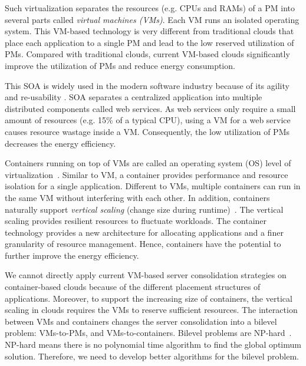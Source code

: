 Such virtualization separates the resources (e.g. CPUs and RAMs) of a PM into several parts called \emph{virtual machines (VMs)}. 
Each VM runs an isolated operating system. This VM-based technology is very different from 
traditional clouds that place each application to a single PM and lead to the low reserved utilization of PMs. 
Compared with traditional clouds, current VM-based clouds significantly improve the utilization of PMs and reduce energy consumption.


 This SOA is widely used in the modern software industry because of its agility and re-usability \cite{Sprott:2004wt}.
SOA separates a centralized application into multiple distributed components called web services. 
As web services only require a small amount of resources (e.g. 15\% of a typical CPU), 
using a VM for a web service causes resource wastage inside a VM. Consequently, the low utilization of PMs decreases
the energy efficiency.


 Containers running on top of 
VMs are called an operating system (OS) level of virtualization~\cite{Soltesz:2007cu}. Similar to VM, 
a container provides performance and resource isolation for a single application. 
Different to VMs, multiple containers can run in the same VM without interfering with each other. 
In addition, containers naturally support \emph{vertical scaling} (change size during runtime)~\cite{Vaquero:2011gb}. 
The vertical scaling provides resilient resources to fluctuate workloads. The container technology provides a new 
architecture for allocating applications and a finer granularity of resource management. Hence, containers have the potential to further
improve the energy efficiency.



We cannot directly apply current VM-based server consolidation strategies on container-based clouds because 
of the different placement structures of applications. Moreover, to support the increasing size of containers, 
the vertical scaling in clouds requires the VMs to reserve sufficient resources. The interaction between VMs and containers changes 
the server consolidation into a bilevel problem: VMs-to-PMs, and VMs-to-containers. Bilevel problems are NP-hard~\cite{Sinha:2013tn}.  NP-hard means there is no polynomial time algorithm to find the global optimum solution. Therefore, we need to develop better algorithms for the bilevel problem.

